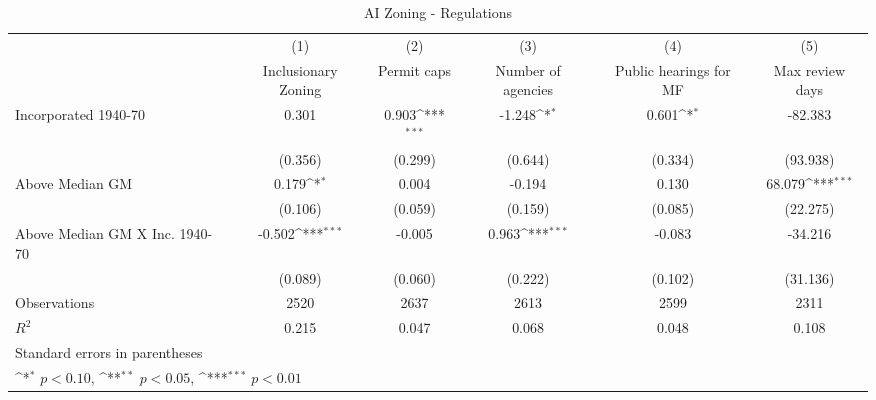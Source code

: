 \begin{table}[htbp]\centering
\def\sym#1{\ifmmode^{#1}\else\(^{#1}\)\fi}
\caption{AI Zoning - Regulations}
\begin{tabular}{l*{5}{c}}
\hline\hline
                    &\multicolumn{1}{c}{(1)}&\multicolumn{1}{c}{(2)}&\multicolumn{1}{c}{(3)}&\multicolumn{1}{c}{(4)}&\multicolumn{1}{c}{(5)}\\
                    &\multicolumn{1}{c}{Inclusionary Zoning}&\multicolumn{1}{c}{Permit caps}&\multicolumn{1}{c}{Number of agencies}&\multicolumn{1}{c}{Public hearings for MF}&\multicolumn{1}{c}{Max review days}\\
\hline
Incorporated 1940-70&       0.301         &       0.903\sym{***}&      -1.248\sym{*}  &       0.601\sym{*}  &     -82.383         \\
                    &     (0.356)         &     (0.299)         &     (0.644)         &     (0.334)         &    (93.938)         \\
[1em]
Above Median GM     &       0.179\sym{*}  &       0.004         &      -0.194         &       0.130         &      68.079\sym{***}\\
                    &     (0.106)         &     (0.059)         &     (0.159)         &     (0.085)         &    (22.275)         \\
[1em]
Above Median GM X Inc. 1940-70&      -0.502\sym{***}&      -0.005         &       0.963\sym{***}&      -0.083         &     -34.216         \\
                    &     (0.089)         &     (0.060)         &     (0.222)         &     (0.102)         &    (31.136)         \\
\hline
Observations        &        2520         &        2637         &        2613         &        2599         &        2311         \\
\(R^{2}\)           &       0.215         &       0.047         &       0.068         &       0.048         &       0.108         \\
\hline\hline
\multicolumn{6}{l}{\footnotesize Standard errors in parentheses}\\
\multicolumn{6}{l}{\footnotesize \sym{*} \(p<0.10\), \sym{**} \(p<0.05\), \sym{***} \(p<0.01\)}\\
\end{tabular}
\end{table}
